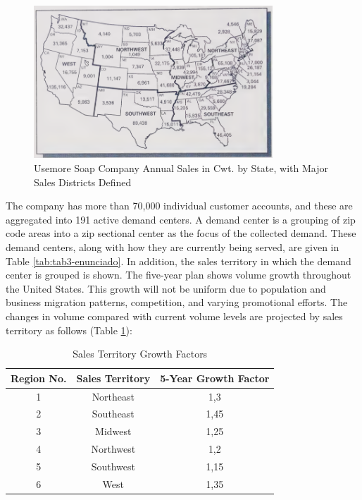 \documentclass[12pt,a4paper]{article}
\begin{document}
\begin{figure}
    \centering
    \includegraphics[width=0.8\textwidth]{images/enunciado/figura01.png}
    \caption{Usemore Soap Company Annual Sales in Cwt. by State, with Major Sales Districts Defined}\label{fig:salesTerritories}
\end{figure}


The company has more than 70,000 individual customer accounts, and these are aggregated into 191 active demand centers.
A demand center is a grouping of zip code areas into a zip sectional center as the focus of the collected demand.
These demand centers, along with how they are currently being served, are given in Table \ref{tab:tab3-enunciado}.
In addition, the sales territory in which the demand center is grouped is shown.
The five-year plan shows volume growth throughout the United States.
This growth will not be uniform due to population and business migration patterns, competition, and varying promotional efforts.
The changes in volume compared with current volume levels are projected by sales territory as follows (Table \ref{tab:tabelaa-enunciado}):

\begin{table}[!h]
    \centering
    \caption{Sales Territory Growth Factors} \label{tab:tabelaa-enunciado}
    \begin{tabular}{|c|c|c|}
    \hline
    \textbf{Region No.} & \textbf{Sales Territory} & \textbf{5-Year Growth Factor} \\
    \hline
    1                   & Northeast                & 1,3                           \\
    2                   & Southeast                & 1,45                          \\
    3                   & Midwest                  & 1,25                          \\
    4                   & Northwest                & 1,2                           \\
    5                   & Southwest                & 1,15                          \\
    6                   & West                     & 1,35     \\
    \hline
\end{tabular}
\end{table}
\end{document}

